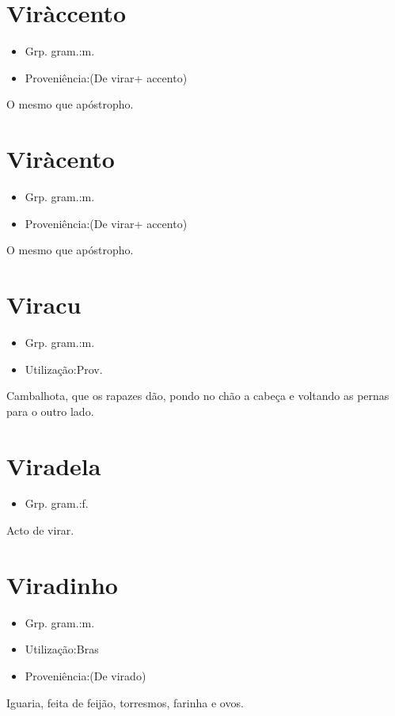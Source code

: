 \documentclass{article}
\begin{document}
\section{Viràccento}
\begin{itemize}
\item {Grp. gram.:m.}
\end{itemize}
\begin{itemize}
\item {Proveniência:(De \textunderscore virar\textunderscore  + \textunderscore accento\textunderscore )}
\end{itemize}
O mesmo que \textunderscore apóstropho\textunderscore .
\section{Viràcento}
\begin{itemize}
\item {Grp. gram.:m.}
\end{itemize}
\begin{itemize}
\item {Proveniência:(De \textunderscore virar\textunderscore  + \textunderscore accento\textunderscore )}
\end{itemize}
O mesmo que \textunderscore apóstropho\textunderscore .
\section{Viracu}
\begin{itemize}
\item {Grp. gram.:m.}
\end{itemize}
\begin{itemize}
\item {Utilização:Prov.}
\end{itemize}
Cambalhota, que os rapazes dão, pondo no chão a cabeça e voltando as pernas para o outro lado.
\section{Viradela}
\begin{itemize}
\item {Grp. gram.:f.}
\end{itemize}
Acto de virar.
\section{Viradinho}
\begin{itemize}
\item {Grp. gram.:m.}
\end{itemize}
\begin{itemize}
\item {Utilização:Bras}
\end{itemize}
\begin{itemize}
\item {Proveniência:(De \textunderscore virado\textunderscore )}
\end{itemize}
Iguaria, feita de feijão, torresmos, farinha e ovos.
\end{document}
